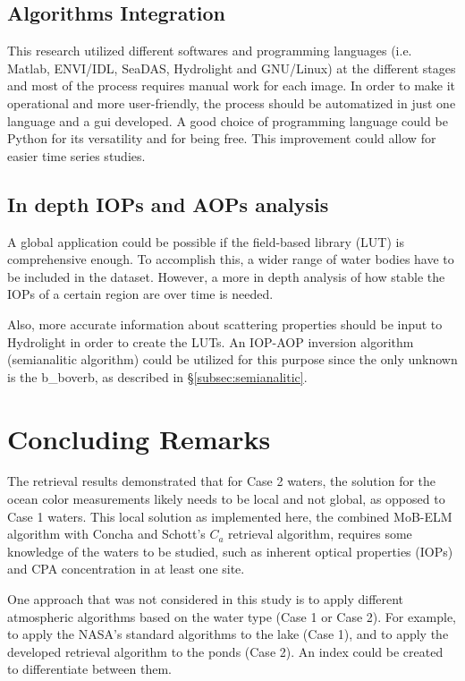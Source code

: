 \subsection{Algorithms Integration}
This research utilized different softwares and programming languages (i.e. Matlab, ENVI/IDL, SeaDAS, Hydrolight and GNU/Linux) at the different stages and most of the process requires manual work for each image. In order to make it operational and more user-friendly, the process should be automatized in just one language and a \gls{gui} developed. A good choice of programming language could be Python for its versatility and for being free. This improvement could allow for easier time series studies.

\subsection{In depth IOPs and AOPs analysis}
A global application could be possible if the field-based library (LUT) is comprehensive enough. To accomplish this, a wider range of water bodies have to be included in the dataset. However, a more in depth analysis of how stable the IOPs of a certain region are over time is needed. 

Also, more accurate information about scattering properties should be input to Hydrolight in order to create the LUTs. An IOP-AOP inversion algorithm (semianalitic algorithm) could be utilized for this purpose since the only unknown is the \gls{b_boverb}, as described in \S\ref{subsec:semianalitic}.

\section{Concluding Remarks}
The retrieval results demonstrated that for Case 2 waters, the solution for the ocean color measurements likely needs to be local and not global, as opposed to Case 1 waters. This local solution as implemented here, the combined MoB-ELM algorithm with Concha and Schott's $C_a$ retrieval algorithm, requires some knowledge of the waters to be studied, such as inherent optical properties (IOPs) and CPA concentration in at least one site.

One approach that was not considered in this study is to apply different atmospheric algorithms based on the water type (Case 1 or Case 2). For example, to apply the NASA's standard algorithms to the lake (Case 1), and to apply the developed retrieval algorithm to the ponds (Case 2). An index could be created to differentiate between them.

